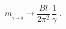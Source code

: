 \begin{equation}
m_{{}_{\gamma\to 0}}\to\frac{Bl}{2\pi^2}\,\frac{1}{\gamma}\ .
\label{u4}
\end{equation}

